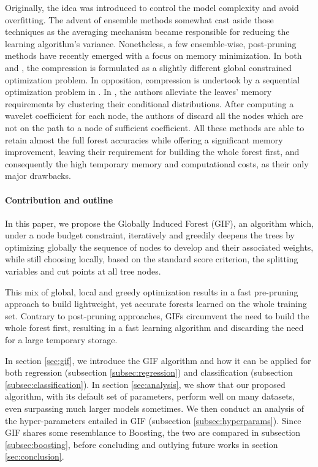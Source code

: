 \documentclass{article}
\begin{document}
Originally, the idea was introduced to control the model complexity and avoid 
overfitting. The advent of ensemble methods somewhat cast aside those 
techniques as the averaging mechanism became responsible for reducing the 
learning algorithm's variance. Nonetheless, a few ensemble-wise, post-pruning 
methods have recently emerged with a focus on memory minimization. In both 
\citet{meinshausen2009forestgarrote} and \citet{l1basedcomp}, the compression 
is formulated as a slightly different global constrained optimization problem. 
In opposition, compression is undertook by a sequential optimization problem in 
\citet{ren2015glorefinement}.
In \citet{vleeschouwer2015mitimemreq}, the authors alleviate the leaves' memory 
requirements by clustering their conditional distributions. After computing a 
wavelet coefficient for each node, the authors of \citet{elisha2016wavelet} 
discard all the nodes which are not on the path to a node of sufficient 
coefficient.
All these methods are able to retain almost the full forest accuracies while 
offering a significant memory improvement, leaving their requirement for 
building the whole forest first, and consequently the high temporary memory and 
computational costs, as their only major drawbacks.


\paragraph{Contribution and outline}
In this paper, we propose the Globally Induced Forest (GIF), an algorithm 
which, under a node budget constraint, iteratively and greedily deepens the 
trees by optimizing globally the sequence of nodes to develop and their 
associated weights, while still choosing locally, based on the standard score 
criterion, the splitting variables and cut points at all tree nodes. 

This mix of global, local and greedy optimization results in a fast pre-pruning 
approach to build lightweight, yet accurate forests learned on the whole 
training set. Contrary to post-pruning approaches, GIFs circumvent the need to 
build the whole forest first, resulting in a fast learning algorithm and 
discarding the need for a large temporary storage.

In section \ref{sec:gif}, we introduce the GIF algorithm and how it can be 
applied for both regression (subsection \ref{subsec:regression}) and 
classification (subsection \ref{subsec:classification}). 
In section \ref{sec:analysis}, we show that our proposed algorithm, with its 
default set of parameters, perform well on many datasets, even surpassing much 
larger models sometimes. We then conduct an analysis of the hyper-parameters 
entailed in GIF (subsection \ref{subsec:hyperparams}). Since GIF shares some 
resemblance to Boosting, the two are compared in subsection 
\ref{subsec:boosting}, before concluding and outlying future works in section 
\ref{sec:conclusion}. 
\end{document}
